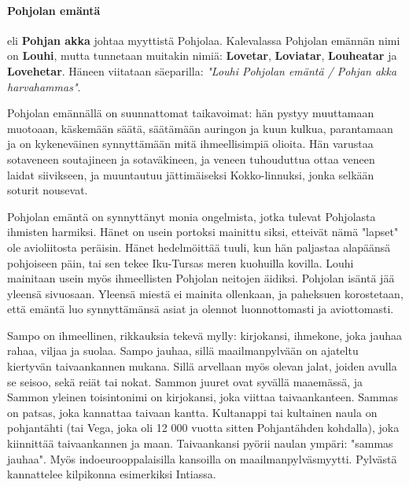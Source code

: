   \paragraph{Pohjolan emäntä} eli \textbf{Pohjan akka} johtaa myyttistä Pohjolaa. Kalevalassa 
  Pohjolan emännän nimi on \textbf{Louhi}, mutta tunnetaan muitakin nimiä: \textbf{Lovetar}, 
  \textbf{Loviatar}, \textbf{Louheatar} ja \textbf{Lovehetar}. Häneen viitataan säeparilla: \emph{"Louhi 
  Pohjolan emäntä / Pohjan akka harvahammas"}.\par Pohjolan emännällä on suunnattomat taikavoimat: hän 
  pystyy muuttamaan muotoaan, käskemään säätä, säätämään auringon ja kuun kulkua, parantamaan 
  ja on kykeneväinen synnyttämään mitä ihmeellisimpiä olioita. Hän varustaa sotaveneen soutajineen 
  ja sotaväkineen, ja veneen tuhouduttua ottaa veneen laidat siivikseen, ja muuntautuu 
  jättimäiseksi Kokko-linnuksi, jonka selkään soturit nousevat. \par Pohjolan emäntä on synnyttänyt 
  monia ongelmista, jotka tulevat Pohjolasta ihmisten harmiksi. Hänet on usein portoksi mainittu 
  siksi, etteivät nämä "lapset" ole avioliitosta peräisin. Hänet hedelmöittää tuuli, kun hän 
  paljastaa alapäänsä pohjoiseen päin, tai sen tekee Iku-Tursas meren kuohuilla kovilla. Louhi 
  mainitaan usein myös ihmeellisten Pohjolan neitojen äidiksi. Pohjolan isäntä jää yleensä 
  sivuosaan. Yleensä miestä ei mainita ollenkaan, ja paheksuen korostetaan, että emäntä luo 
  synnyttämänsä asiat ja olennot luonnottomasti ja aviottomasti. 
 

  Sampo on ihmeellinen, rikkauksia tekevä mylly: kirjokansi, ihmekone, joka jauhaa rahaa, viljaa ja 
  suolaa. Sampo jauhaa, sillä maailmanpylvään on ajateltu kiertyvän taivaankannen mukana. Sillä 
  arvellaan myös olevan jalat, joiden avulla se seisoo, sekä reiät tai nokat. Sammon juuret ovat 
  syvällä maaemässä, ja Sammon yleinen toisintonimi on kirjokansi, joka viittaa taivaankanteen. 
  Sammas on patsas, joka kannattaa taivaan kantta. Kultanappi tai kultainen naula on pohjantähti
  (tai Vega, joka oli 12 000 vuotta sitten Pohjantähden kohdalla), 
  joka kiinnittää taivaankannen ja maan. Taivaankansi pyörii naulan ympäri: "sammas jauhaa".
  Myös indoeurooppalaisilla kansoilla on maailmanpylväsmyytti. Pylvästä kannattelee kilpikonna 
  esimerkiksi Intiassa.

